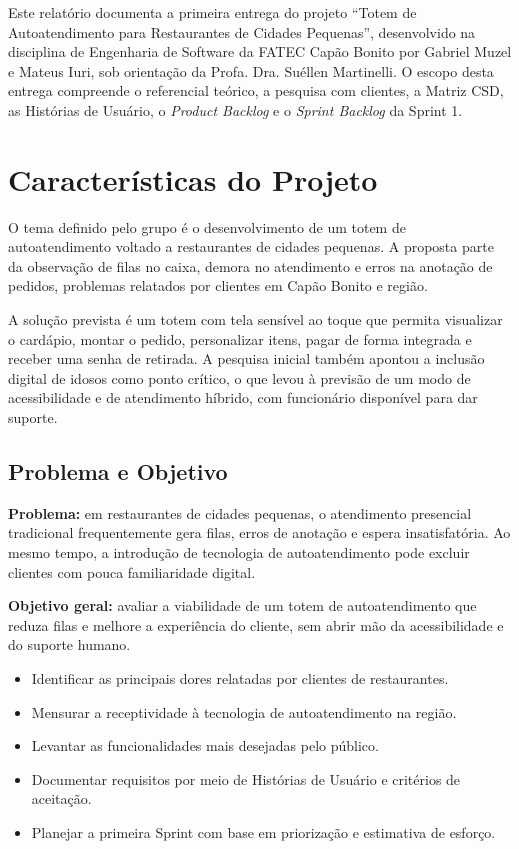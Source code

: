 \documentclass[12pt, oneside, a4paper, chapter=TITLE,section=TITLE]{abntex2}
\begin{document}
Este relatório documenta a primeira entrega do projeto ``Totem de Autoatendimento para Restaurantes de Cidades Pequenas'', desenvolvido na disciplina de Engenharia de Software da FATEC Capão Bonito por Gabriel Muzel e Mateus Iuri, sob orientação da Profa. Dra. Suéllen Martinelli. O escopo desta entrega compreende o referencial teórico, a pesquisa com clientes, a Matriz CSD, as Histórias de Usuário, o \textit{Product Backlog} e o \textit{Sprint Backlog} da Sprint 1.

\chapter{Características do Projeto}

O tema definido pelo grupo é o desenvolvimento de um totem de autoatendimento voltado a restaurantes de cidades pequenas. A proposta parte da observação de filas no caixa, demora no atendimento e erros na anotação de pedidos, problemas relatados por clientes em Capão Bonito e região.

A solução prevista é um totem com tela sensível ao toque que permita visualizar o cardápio, montar o pedido, personalizar itens, pagar de forma integrada e receber uma senha de retirada. A pesquisa inicial também apontou a inclusão digital de idosos como ponto crítico, o que levou à previsão de um modo de acessibilidade e de atendimento híbrido, com funcionário disponível para dar suporte.

\section{Problema e Objetivo}

\textbf{Problema:} em restaurantes de cidades pequenas, o atendimento presencial tradicional frequentemente gera filas, erros de anotação e espera insatisfatória. Ao mesmo tempo, a introdução de tecnologia de autoatendimento pode excluir clientes com pouca familiaridade digital.

\textbf{Objetivo geral:} avaliar a viabilidade de um totem de autoatendimento que reduza filas e melhore a experiência do cliente, sem abrir mão da acessibilidade e do suporte humano.

\begin{itemize}
    \item Identificar as principais dores relatadas por clientes de restaurantes.
    \item Mensurar a receptividade à tecnologia de autoatendimento na região.
    \item Levantar as funcionalidades mais desejadas pelo público.
    \item Documentar requisitos por meio de Histórias de Usuário e critérios de aceitação.
    \item Planejar a primeira Sprint com base em priorização e estimativa de esforço.
\end{itemize}
\end{document}
